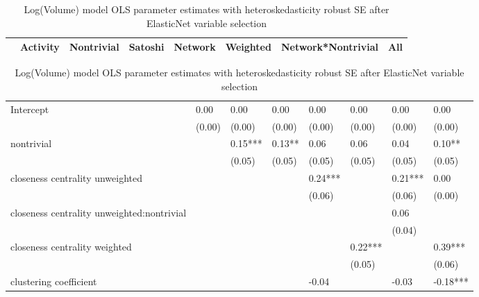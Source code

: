 \begin{table}
\caption{Log(Volume) model OLS parameter estimates with heteroskedasticity robust SE after ElasticNet variable selection}
\begin{center}
\begin{tabular}{lccccccc}
\hline
                                                 & Activity & Nontrivial & Satoshi & Network &   Weighted   & Network*Nontrivial &   All     \\
\hline
\hline
\end{tabular}
\begin{tabular}{llllllll}
Intercept                                        & 0.00     & 0.00       & 0.00    & 0.00    & 0.00         & 0.00               & 0.00      \\
                                                 & (0.00)   & (0.00)     & (0.00)  & (0.00)  & (0.00)       & (0.00)             & (0.00)    \\
nontrivial                                       &          & 0.15***    & 0.13**  & 0.06    & 0.06         & 0.04               & 0.10**    \\
                                                 &          & (0.05)     & (0.05)  & (0.05)  & (0.05)       & (0.05)             & (0.05)    \\
 closeness centrality unweighted            &          &            &         & 0.24*** &              & 0.21***            & 0.00      \\
                                                 &          &            &         & (0.06)  &              & (0.06)             & (0.00)    \\
 closeness centrality unweighted:nontrivial &          &            &         &         &              & 0.06               &           \\
                                                 &          &            &         &         &              & (0.04)             &           \\
 closeness centrality weighted              &          &            &         &         & 0.22***      &                    & 0.39***   \\
                                                 &          &            &         &         & (0.05)       &                    & (0.06)    \\
 clustering coefficient                     &          &            &         & -0.04   &              & -0.03              & -0.18***  \\

\end{tabular}
\end{center}
\end{table}
